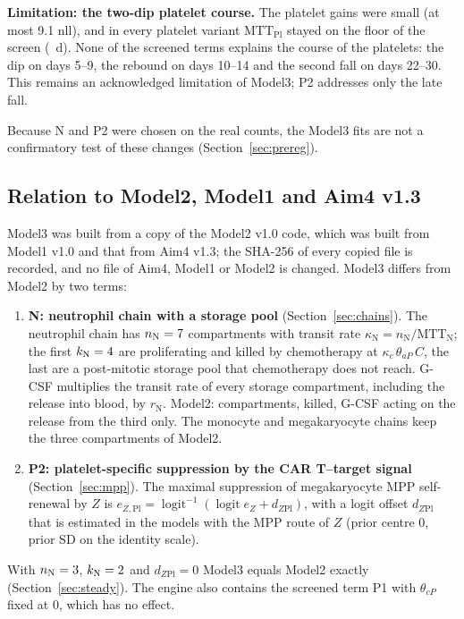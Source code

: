 \documentclass[11pt]{article}
\DeclareMathOperator{\logit}{logit}
\begin{document}
\textbf{Limitation: the two-dip platelet course.} The platelet gains were small (at most 9.1 nll), and in every platelet variant $\mathrm{MTT}_{\mathrm{Pl}}$ stayed on the floor of the screen (\valPScreenMttPl~d). None of the screened terms explains the course of the platelets: the dip on days 5--9, the rebound on days 10--14 and the second fall on days 22--30. This remains an acknowledged limitation of Model3; P2 addresses only the late fall.

Because N and P2 were chosen on the real counts, the Model3 fits are not a confirmatory test of these changes (Section~\ref{sec:prereg}).




\subsection{Relation to Model2, Model1 and Aim4 v1.3}\label{sec:changes}
Model3 was built from a copy of the Model2 v1.0 code, which was built from Model1 v1.0 and that from Aim4 v1.3; the SHA-256 of every copied file is recorded, and no file of Aim4, Model1 or Model2 is changed. Model3 differs from Model2 by two terms:
\begin{enumerate}
\item \textbf{N: neutrophil chain with a storage pool} (Section~\ref{sec:chains}). The neutrophil chain has $n_{\mathrm{N}}=7$ compartments with transit rate $\kappa_{\mathrm{N}}=n_{\mathrm{N}}/\mathrm{MTT}_{\mathrm{N}}$; the first $k_{\mathrm{N}}=4$ are proliferating and killed by chemotherapy at $\kappa_c\,\theta_{aP}\,C$, the last \valNStore{} are a post-mitotic storage pool that chemotherapy does not reach. G-CSF multiplies the transit rate of every storage compartment, including the release into blood, by $r_{\mathrm{N}}$. Model2: \valNTrNModelTwo{} compartments, \valNkNModelTwo{} killed, G-CSF acting on the release from the third only. The monocyte and megakaryocyte chains keep the three compartments of Model2.
\item \textbf{P2: platelet-specific suppression by the CAR T--target signal} (Section~\ref{sec:mpp}). The maximal suppression of megakaryocyte MPP self-renewal by $Z$ is $e_{Z,\mathrm{Pl}}=\logit^{-1}(\logit e_Z+d_{Z\mathrm{Pl}})$, with a logit offset $d_{Z\mathrm{Pl}}$ that is estimated in the models with the MPP route of $Z$ (prior centre 0, prior SD \valDzplSd{} on the identity scale).
\end{enumerate}
With $n_{\mathrm{N}}=3$, $k_{\mathrm{N}}=2$ and $d_{Z\mathrm{Pl}}=0$ Model3 equals Model2 exactly (Section~\ref{sec:steady}). The engine also contains the screened term P1 with $\theta_{cP}$ fixed at 0, which has no effect.
\end{document}
